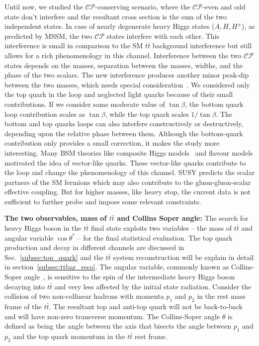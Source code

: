 
Until now, we studied the $\mathcal{CP}$-conserving scenario, where the $\mathcal{CP}$-even and odd state don't interfere and the resultant cross section is the sum of the two independent states. In case of nearly degenerate heavy Higgs states ($A, H, H^{\pm}$), as predicted by MSSM, the two $\mathcal{CP}$ states interfere with each other. This interference is small in comparison to the SM $t\bar t$ background interference but still allows for a rich phenomenology in this channel. Interference between the two $\mathcal{CP}$ states depends on the masses, separation between the masses, widths, and the phase of the two scalars. The new interference produces another minor peak-dip between the two masses, which needs special consideration~\cite{Carena:2016npr}. We considered only the top quark in the loop and neglected light quarks because of their small contributions. If we consider some moderate value of $\tan\beta$, the bottom quark loop contribution scales as $\tan\beta$, while the top quark scales $1/\tan\beta$. The bottom and top quarks loops can also interfere constructively or destructively, depending upon the relative phase between them. Although the bottom-quark contribution only provides a small correction, it makes the study more interesting. Many BSM theories like composite Higgs models~\cite{vonGersdorff:2015fta} and flavour models motivated the idea of vector-like quarks. These vector-like quarks contribute to the loop and change the phenomenology of this channel. SUSY predicts the scalar partners of the SM fermions which may also contribute to the gluon-gluon-scalar effective coupling. But for higher masses, like heavy stop, the current data is not sufficient to further probe and impose some relevant constraints.      

\noindent \textbf{The two observables, mass of $t\bar t$ and Collins Soper angle:}
The search for heavy Higgs boson in the $t\bar t$ final state exploits two variables – the mass of $t\bar t$ and angular variable $\cos\theta^{*}$ – for the final statistical evaluation. The top quark production and decay in different channels are discussed in Sec.~\ref{subsec:top_quark} and the $t\bar t$ system reconstruction will be explain in detail in section~\ref{subsec:ttbar_reco}. The angular variable, commonly known as Collins-Soper angle~\cite{collins_soper}, is sensitive to the spin of the intermediate heavy Higgs boson decaying into $t\bar t$ and very less affected by the initial state radiation. Consider the collision of two non-collinear hadrons with momenta $p_{1}$ and $p_{2}$ in the rest mass frame of the $t\bar t$. The resultant top and anti-top quark will not be back-to-back and will have non-zero transverse momentum. The Collins-Soper angle $\theta$ is defined as being the angle between the axis that bisects the angle between $p_{1}$ and $p_{2}$ and the top quark momentum in the $t\bar t$ rest frame.

